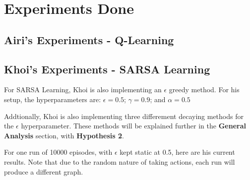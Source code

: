 \documentclass[nohyperref]{article}
\theoremstyle{plain}
\theoremstyle{definition}
\theoremstyle{remark}
\begin{document}
\section{Experiments Done}

\subsection{Airi's Experiments - Q-Learning}






\subsection{Khoi's Experiments - SARSA Learning}
For SARSA Learning, Khoi is also implementing an $\epsilon$ greedy method. For his setup, the hyperparameters are: $\epsilon = 0.5$; $\gamma = 0.9$; and $\alpha = 0.5$

Addtionally, Khoi is also implementing three differement decaying methods for the $\epsilon$ hyperparameter. These methods will be explained further in the \textbf{General Analysis} section, with \textbf{Hypothesis 2}.

For one run of 10000 episodes, with $\epsilon$ kept static at 0.5, here are his current results. Note that due to the random nature of taking actions, each run will produce a different graph.
\end{document}
